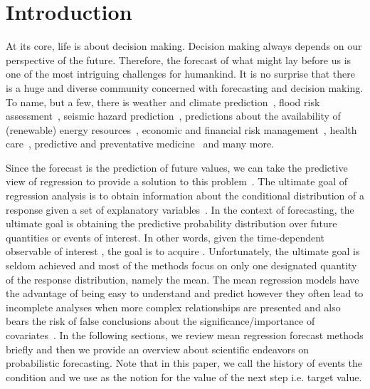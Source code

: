 \documentclass{ieeeaccess}
\begin{document}
\titlepgskip=-15pt

\maketitle

\section{Introduction}
\label{sec:introduction}
At its core, life is about decision making. Decision making always depends on our perspective of the future. Therefore, the forecast of what might lay before us is one of the most intriguing challenges for humankind. It is no surprise that there is a huge and diverse community concerned with forecasting and decision making. To name, but a few, there is weather and climate prediction~\cite{racah2017extremeweather,rodrigues2018deepdownscale}, flood risk assessment~\cite{wiesel2018ml}, seismic hazard prediction~\cite{DBLP:journals/corr/abs-1810-01965,DBLP:journals/corr/abs-1809-02880}, predictions about the availability of (renewable) energy resources~\cite{gensler2018multi,DBLP:journals/corr/ChenWKZ17}, economic and financial risk management~\cite{DBLP:journals/corr/abs-1811-10791,DBLP:journals/corr/abs-1811-03711}, health care~\cite{DBLP:journals/corr/abs-1812-00371,DBLP:journals/corr/abs-1811-12234,DBLP:journals/corr/abs-1711-06402}, predictive and preventative medicine~\cite{zitnik2019machine} and many more. 

Since the forecast is the prediction of future values, we can take the predictive view of regression to provide a solution to this problem~\cite{gneiting2014probabilistic}. The ultimate goal of regression analysis is to obtain information about the conditional distribution of a response given a set of explanatory variables~\cite{hothorn2014conditional}. In the context of forecasting, the ultimate goal is obtaining the predictive probability distribution over future quantities or events of interest. In other words, given the time-dependent observable of interest , the goal is to acquire . Unfortunately, the ultimate goal is seldom achieved and most of the methods focus on only one designated quantity of the response distribution, namely the mean. The mean regression models have the advantage of being easy to understand and predict however they often lead to incomplete analyses when more complex relationships are presented and also bears the risk of false conclusions about the significance/importance of covariates~\cite{kneib2013beyond}. In the following sections, we review mean regression forecast methods briefly and then we provide an overview about scientific endeavors on probabilistic forecasting. Note that in this paper, we call the history of events  the condition  and we use  as the notion for the value of the next step i.e. target value.
\end{document}

